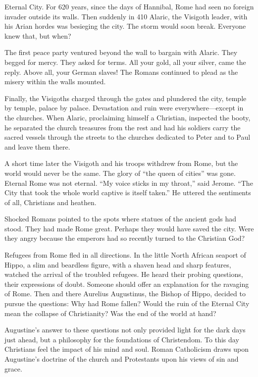 
 Eternal City. For 620 years, since the days of Hannibal, Rome had
seen no foreign invader outside its walls. Then suddenly in 410 Alaric, the Visigoth leader, with
his Arian hordes was besieging the city. The storm would soon break. Everyone knew that, but when?

The first peace party ventured beyond the wall to bargain with Alaric. They begged for mercy. They
asked for terms. All your gold, all your silver, came the reply. Above all, your German slaves! The
Romans continued to plead as the misery within the walls mounted.

Finally, the Visigoths charged through the gates and plundered the city, temple by temple, palace by
palace. Devastation and ruin were everywhere—except in the churches. When Alaric, proclaiming
himself a Christian, inspected the booty, he separated the church treasures from the rest and had
his soldiers carry the sacred vessels through the streets to the churches dedicated to Peter and to
Paul and leave them there.

A short time later the Visigoth and his troops withdrew from Rome, but the world would never be the
same. The glory of “the queen of cities” was gone. Eternal Rome was not eternal. “My voice sticks in
my throat,” said Jerome. “The City that took the whole world captive is itself taken.” He uttered
the sentiments of all, Christians and heathen.

Shocked Romans pointed to the spots where statues of the ancient gods had stood. They had made Rome
great. Perhaps they would have saved the city. Were they angry because the emperors had so recently
turned to the Christian God?

Refugees from Rome fled in all directions. In the little North African seaport of Hippo, a slim and
beardless figure, with a shaven head and sharp features, watched the arrival of the troubled
refugees. He heard their probing questions, their expressions of doubt. Someone should offer an
explanation for the ravaging of Rome. Then and there Aurelius Augustinus, the Bishop of Hippo,
decided to pursue the questions: Why had Rome fallen? Would the ruin of the Eternal City mean the
collapse of Christianity? Was the end of the world at hand?

Augustine’s answer to these questions not only provided light for the dark days just ahead, but a
philosophy for the foundations of Christendom. To this day Christians feel the impact of his mind
and soul. Roman Catholicism draws upon Augustine’s doctrine of the church and Protestants upon his
views of sin and grace.

